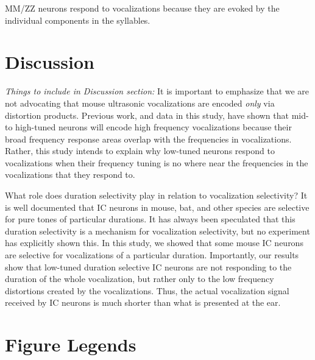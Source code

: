 \documentclass[12pt]{article}
\begin{document}
MM/ZZ neurons respond to vocalizations because they are evoked by the individual components in the syllables. 



\section*{\label{sec:discussion}Discussion}

\textit{Things to include in Discussion section:} 
It is important to emphasize that we are not advocating that mouse ultrasonic vocalizations are encoded \textit{only} via distortion products. Previous work, and data in this study, have shown that mid- to high-tuned neurons will encode high frequency vocalizations because their broad frequency response areas overlap with the frequencies in vocalizations. Rather, this study intends to explain why low-tuned neurons respond to vocalizations when their frequency tuning is no where near the frequencies in the vocalizations that they respond to. 

What role does duration selectivity play in relation to vocalization selectivity? It is well documented that IC neurons in mouse, bat, and other species are selective for pure tones of particular durations. It has always been speculated that this duration selectivity is a mechanism for vocalization selectivity, but no experiment has explicitly shown this. In this study, we showed that some mouse IC neurons are selective for vocalizations of a particular duration. %
Importantly, our results show that low-tuned duration selective IC neurons are not responding to the duration of the whole vocalization, but rather only to the low frequency distortions created by the vocalizations. Thus, the actual vocalization signal received by IC neurons is much shorter than what is presented at the ear. 

\newpage




\newpage

\section*{\label{sec:legends}Figure Legends}
\end{document}
